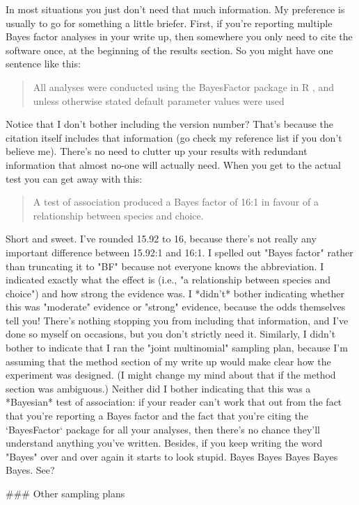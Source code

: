 In most situations you just don't need that much information. My preference is usually to go for something a little briefer. First, if you're reporting multiple Bayes factor analyses in your write up, then somewhere you only need to cite the software once, at the beginning of the results section. So you might have one sentence like this:
\begin{quote}
All analyses were conducted using the BayesFactor package in R \cite{Morey2015}, and unless otherwise stated default parameter values were used
\end{quote}
Notice that I don't bother including the version number? That's because the citation itself includes that information (go check my reference list if you don't believe me). There's no need to clutter up your results with redundant information that almost no-one will actually need. When you get to the actual test you can get away with this:
\begin{quote}
A test of association produced a Bayes factor of 16:1 in favour of a relationship between species and choice.
\end{quote}
Short and sweet. I've rounded 15.92 to 16, because there's not really any important difference between 15.92:1 and 16:1. I spelled out "Bayes factor" rather than truncating it to "BF" because not everyone knows the abbreviation. I indicated exactly what the effect is (i.e., "a relationship between species and choice") and how strong the evidence was. I *didn't* bother indicating whether this was "moderate" evidence or "strong" evidence, because the odds themselves tell you! There's nothing stopping you from including that information, and I've done so myself on occasions, but you don't strictly need it. Similarly, I didn't bother to indicate that I ran the "joint multinomial" sampling plan, because I'm assuming that the method section of my write up would make clear how the experiment was designed. (I might change my mind about that if the method section was ambiguous.) Neither did I bother indicating that this was a *Bayesian* test of association: if your reader can't work that out from the fact that you're reporting a Bayes factor and the fact that you're citing the `BayesFactor` package for all your analyses, then there's no chance they'll understand anything you've written. Besides, if you keep writing the word "Bayes" over and over again it starts to look stupid. Bayes Bayes Bayes Bayes Bayes. See?



### Other sampling plans

